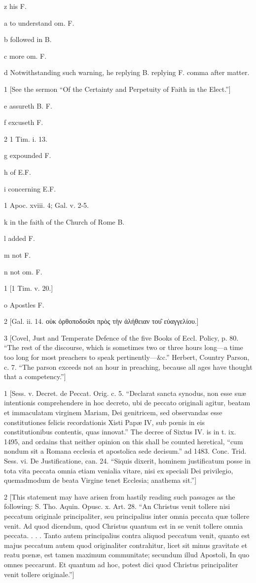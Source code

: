 z
his F.

a
to understand om. F.

b
followed in B.

c
more om. F.

d
Notwithstanding such warning, he replying B. replying F. comma after matter.

1
[See the sermon “Of the Certainty and Perpetuity of Faith in the Elect.”]

e
assureth B. F.

f
excuseth F.

2
1 Tim. i. 13.

g
expounded F.

h
of E.F.

i
concerning E.F.

1
Apoc. xviii. 4; Gal. v. 2-5.

k
in the faith of the Church of Rome B.

l
added F.

m
not F.

n
not om. F.

1
[1 Tim. v. 20.]

o
Apostles F.

2
[Gal. ii. 14. οὐκ ὀρθοποδου̑σι πρὸς τὴν ἀλήθειαν του̑ εὐαγγελίου.]

3
[Covel, Just and Temperate Defence of the five Books of Eccl. Policy, p. 80. “The rest of the discourse, which is sometimes two or three hours long—a time too long for most preachers to speak pertinently—&c.” Herbert, Country Parson, c. 7. “The parson exceeds not an hour in preaching, because all ages have thought that a competency.”]

1
[Sess. v. Decret. de Peccat. Orig. c. 5. “Declarat sancta synodus, non esse suæ intentionis comprehendere in hoc decreto, ubi de peccato originali agitur, beatam et immaculatam virginem Mariam, Dei genitricem, sed observandas esse constitutiones felicis recordationis Xisti Papæ IV, sub pœnis in eis constitutionibus contentis, quas innovat.” The decree of Sixtus IV. is in t. ix. 1495, and ordains that neither opinion on this shall be counted heretical, “cum nondum sit a Romana ecclesia et apostolica sede decisum.” ad 1483. Conc. Trid. Sess. vi. De Justificatione, can. 24. “Siquis dixerit, hominem justificatum posse in tota vita peccata omnia etiam venialia vitare, nisi ex speciali Dei privilegio, quemadmodum de beata Virgine tenet Ecclesia; anathema sit.”]

2
[This statement may have arisen from hastily reading such passages as the following: S. Tho. Aquin. Opusc. x. Art. 28. “An Christus venit tollere nisi peccatum originale principaliter, seu principalius inter omnia peccata quæ tollere venit. Ad quod dicendum, quod Christus quantum est in se venit tollere omnia peccata. . . . Tanto autem principalius contra aliquod peccatum venit, quanto est majus peccatum autem quod originaliter contrahitur, licet sit minus gravitate et reatu pœnæ, est tamen maximum communitate; secundum illud Apostoli, In quo omnes peccarunt. Et quantum ad hoc, potest dici quod Christus principaliter venit tollere originale.”]

